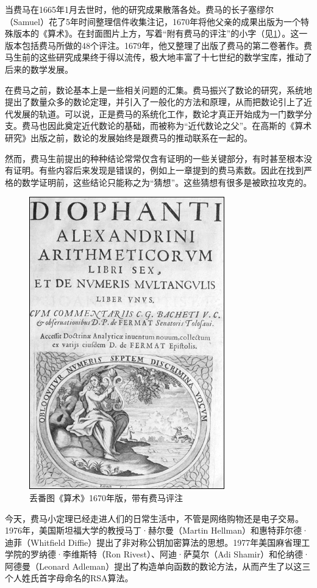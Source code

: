 \documentclass[b5paper]{ctexart}
\begin{document}
\begin{mdframed}
当费马在1665年1月去世时，他的研究成果散落各处。费马的长子塞缪尔（Samuel）花了5年时间整理信件收集注记，1670年将他父亲的成果出版为一个特殊版本的《算术》。在封面图片上方，写着“附有费马的评注”的小字（见\cref{fig:Arithmetica}）。这一版本包括费马所做的48个评注。1679年，他又整理了出版了费马的第二卷著作。费马生前的这些研究成果终于得以流传，极大地丰富了十七世纪的数学宝库，推动了后来的数学发展。

在费马之前，数论基本上是一些相关问题的汇集。费马振兴了数论的研究，系统地提出了数量众多的数论定理，并引入了一般化的方法和原理，从而把数论引上了近代发展的轨道。可以说，正是费马的系统化工作，数论才真正开始成为一门数学分支。费马也因此奠定近代数论的基础，而被称为“近代数论之父”。在高斯的《算术研究》出版之前，数论的发展始终是跟费马的推动联系在一起的。

然而，费马生前提出的种种结论常常仅含有证明的一些关键部分，有时甚至根本没有证明。有些内容后来发现是错误的，例如上一章提到的费马素数。因此在找到严格的数学证明前，这些结论只能称之为“猜想”。这些猜想有很多是被欧拉攻克的。
\end{mdframed}

\begin{figure}[htbp]
 \centering
 \includegraphics[scale=0.4]{img/Arithmetica}
 \caption{丢番图《算术》1670年版，带有费马评注}
 \label{fig:Arithmetica}
\end{figure}

今天，费马小定理已经走进人们的日常生活中，不管是网络购物还是电子交易。1976年，美国斯坦福大学的教授马丁·赫尔曼（Martin Hellman）和惠特菲尔德·迪菲（Whitfield Diffie）提出了非对称公钥加密算法的思想。1977年美国麻省理工学院的罗纳德·李维斯特（Ron Rivest）、阿迪·萨莫尔（Adi Shamir）和伦纳德·阿德曼（Leonard Adleman）提出了构造单向函数的数论方法，从而产生了以这三个人姓氏首字母命名的RSA算法。
\end{document}
